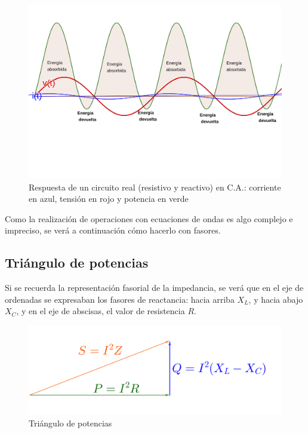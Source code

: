 \begin{figure}[htbp]
  \includegraphics[scale=0.1]{images/potencia_alterna_mixta}
  \caption{Respuesta de un circuito real (resistivo y reactivo) en C.A.: corriente en azul, tensión en rojo y potencia en verde}
  \label{fig:potencia_alterna_mixta}
\end{figure}
Como la realización de operaciones con ecuaciones de ondas es algo complejo e impreciso, se verá a continuación cómo hacerlo con fasores.

\subsection{Triángulo de potencias}

Si se recuerda la representación fasorial de la impedancia, se verá que en el eje de ordenadas se expresaban los fasores de reactancia: hacia arriba $X_L$, y hacia abajo $X_C$, y en el eje de abscisas, el valor de resistencia $R$.

\begin{figure}[htbp]
  \includegraphics[scale=0.16]{images/triangulo_potencias}
  \caption{Triángulo de potencias}
  \label{fig:triangulo_potencias}
\end{figure}

